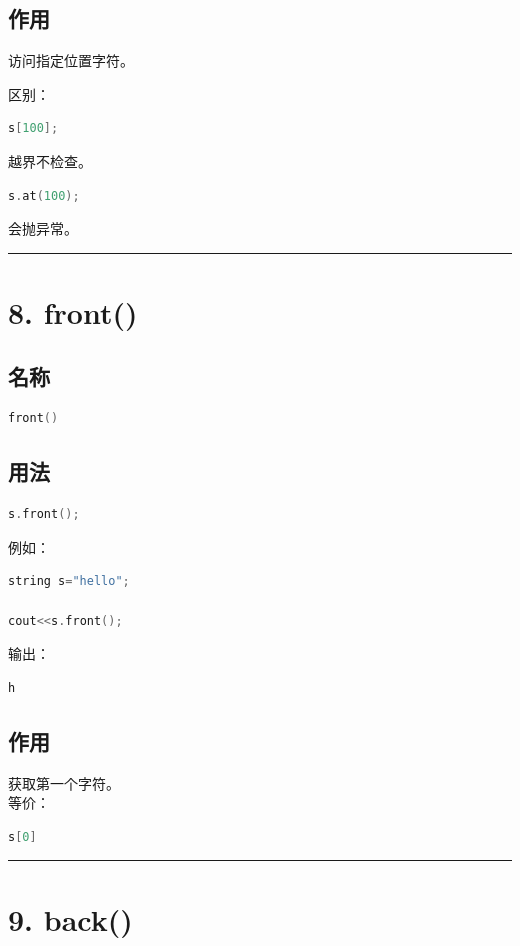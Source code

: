 \documentclass[10pt,twocolumn]{extarticle}
\begin{document}
\subsection{作用}
访问指定位置字符。

区别：
\begin{lstlisting}[language=C++]
s[100];
\end{lstlisting}
越界不检查。

\begin{lstlisting}[language=C++]
s.at(100);
\end{lstlisting}
会抛异常。

\noindent\rule{\linewidth}{0.4pt}

\section{8. front()}

\subsection{名称}
\begin{lstlisting}[language=C++]
front()
\end{lstlisting}

\subsection{用法}
\begin{lstlisting}[language=C++]
s.front();
\end{lstlisting}
例如：
\begin{lstlisting}[language=C++]
string s="hello";

cout<<s.front();
\end{lstlisting}
输出：
\begin{lstlisting}
h
\end{lstlisting}

\subsection{作用}
获取第一个字符。\\
等价：
\begin{lstlisting}[language=C++]
s[0]
\end{lstlisting}

\noindent\rule{\linewidth}{0.4pt}

\section{9. back()}
\end{document}
